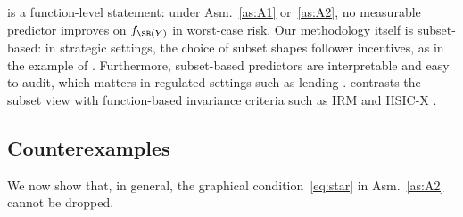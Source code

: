  is a function-level statement: under
Asm.~\ref{as:A1} or~\ref{as:A2}, no measurable predictor improves
on $f_{\SB(Y)}$ in worst-case risk. Our methodology itself is
subset-based:
in strategic
settings, the choice of subset shapes follower incentives, as in the example of . Furthermore, subset-based predictors are interpretable 
and easy to audit, which matters in regulated settings such as lending \citep{chen2018fair, cfpbCircular2022_03}.
 contrasts the subset view
with function-based invariance criteria such as IRM
\citep{arjovskyInvariantRiskMinimization2020} and HSIC-X
\citep{saengkyongamExploitingIndependentInstruments2022}.





\subsection{
Counterexamples } \label{sec:sbnotalwaysopt}
We now show 
that, in general, the graphical condition~\eqref{eq:star} in Asm.~\ref{as:A2} cannot be dropped.

